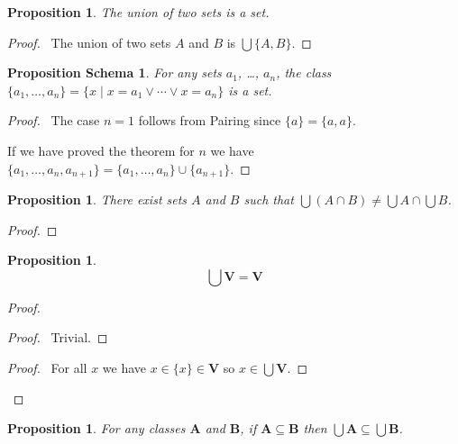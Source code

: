\documentclass{book}
\let\qed\relax
\newtheorem{prop}[ax]{Proposition}
\newtheorem{props}[ax]{Proposition Schema}
\theoremstyle{definition}
\begin{document}
\begin{prop}
The union of two sets is a set.
\end{prop}

\begin{proof}
\pf\ The union of two sets $A$ and $B$ is $\bigcup \{A,B\}$. \qed
\end{proof}

\begin{props}
For any sets $a_1$, \ldots, $a_n$, the class $\{a_1, \ldots, a_n\} = \{x \mid x = a_1 \vee \cdots \vee x = a_n\}$ is a set.
\end{props}

\begin{proof}
\pf\ The case $n=1$ follows from Pairing since $\{a\} = \{a,a\}$.

If we have proved the theorem for $n$ we have $\{a_1, \ldots, a_n, a_{n+1}\} = \{a_1, \ldots, a_n\} \cup \{a_{n+1}\}$. \qed
\end{proof}

\begin{prop}
\label{prop:bigcupcapcounterex}
There exist sets $A$ and $B$ such that $\bigcup (A \cap B) \neq \bigcup A \cap \bigcup B$.
\end{prop}

\begin{proof}
\qed
\end{proof}

\begin{prop}
\label{prop:unionV}
\[ \bigcup \mathbf{V} = \mathbf{V} \]
\end{prop}

\begin{proof}
\pf
{}
\begin{proof}
	\pf\ Trivial.
\end{proof}
\begin{proof}
	\pf\ For all $x$ we have $x \in \{x\} \in \mathbf{V}$ so $x \in \bigcup \mathbf{V}$.
\end{proof}
\qed
\end{proof}

\begin{prop}
\label{prop:unionmonotone}
For any classes $\mathbf{A}$ and $\mathbf{B}$, if $\mathbf{A} \subseteq \mathbf{B}$ then $\bigcup \mathbf{A} \subseteq \bigcup \mathbf{B}$.
\end{prop}
\end{document}
